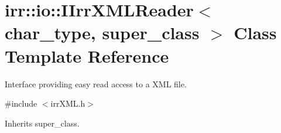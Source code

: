 \hypertarget{classirr_1_1io_1_1IIrrXMLReader}{}\section{irr\+:\+:io\+:\+:I\+Irr\+X\+M\+L\+Reader$<$ char\+\_\+type, super\+\_\+class $>$ Class Template Reference}
\label{classirr_1_1io_1_1IIrrXMLReader}


Interface providing easy read access to a X\+ML file.  




{\ttfamily \#include $<$irr\+X\+M\+L.\+h$>$}



Inherits super\+\_\+class.

